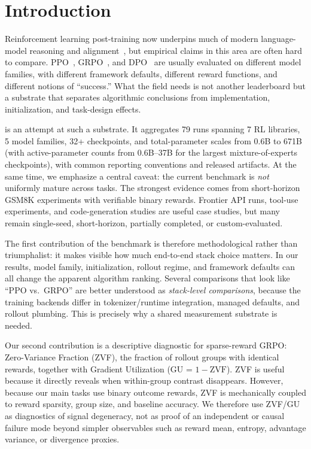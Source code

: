 \section{Introduction}
\label{sec:intro}

Reinforcement learning post-training now underpins much of modern
language-model reasoning and alignment~\citep{ouyang2022training,%
guo2025deepseekr1nature}, but empirical claims in this area are often hard to
compare. PPO~\citep{schulman2017proximal}, GRPO~\citep{shao2024deepseekmath},
and DPO~\citep{rafailov2024direct} are usually evaluated on different model
families, with different framework defaults, different reward functions, and
different notions of ``success.'' What the field needs is not another
leaderboard but a substrate that separates algorithmic conclusions from
implementation, initialization, and task-design effects.

\ours{} is an attempt at such a substrate. It aggregates 79 runs spanning 7 RL
libraries, 5 model families, 32+ checkpoints, and total-parameter scales from
0.6B to 671B (with active-parameter counts from 0.6B--37B for the largest
mixture-of-experts checkpoints), with common reporting conventions and released
artifacts.
At the same time, we emphasize a central caveat: the current benchmark is
\emph{not} uniformly mature across tasks. The strongest evidence comes from
short-horizon GSM8K experiments with verifiable binary rewards. Frontier API
runs, tool-use experiments, and code-generation studies are useful case
studies, but many remain single-seed, short-horizon, partially completed, or
custom-evaluated.

The first contribution of the benchmark is therefore methodological rather than
triumphalist: it makes visible how much end-to-end stack choice matters. In our
results, model family, initialization, rollout regime, and framework defaults
can all change the apparent algorithm ranking. Several comparisons that look
like ``PPO vs.\ GRPO'' are better understood as \emph{stack-level comparisons},
because the training backends differ in tokenizer/runtime integration, managed
defaults, and rollout plumbing. This is precisely why a shared measurement
substrate is needed.

Our second contribution is a descriptive diagnostic for sparse-reward GRPO:
Zero-Variance Fraction (ZVF), the fraction of rollout groups with identical
rewards, together with Gradient Utilization (GU = $1-\mathrm{ZVF}$). ZVF is
useful because it directly reveals when within-group contrast disappears.
However, because our main tasks use binary outcome rewards, ZVF is mechanically
coupled to reward sparsity, group size, and baseline accuracy. We therefore use
ZVF/GU as diagnostics of signal degeneracy, not as proof of an independent or
causal failure mode beyond simpler observables such as reward mean, entropy,
advantage variance, or divergence proxies.

